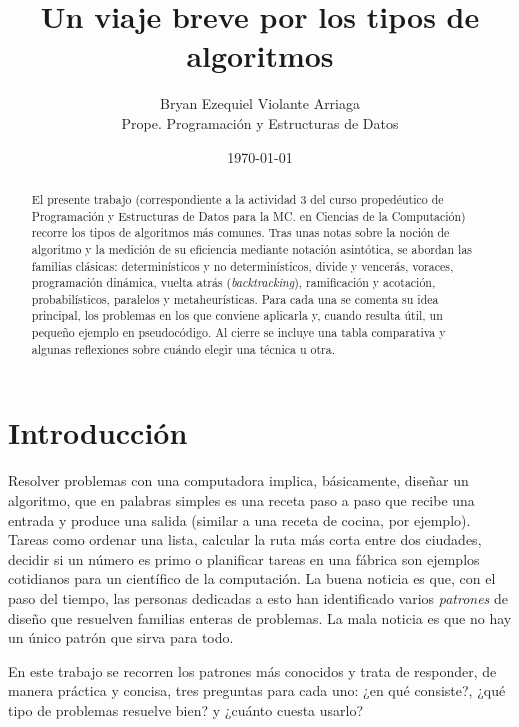 \documentclass[12pt,letterpaper]{article}
\title{\textbf{Un viaje breve por los tipos de algoritmos}}
\author{Bryan Ezequiel Violante Arriaga\\
\small Prope. Programación y Estructuras de Datos\\}
\date{\today}
\begin{document}

\maketitle
\thispagestyle{empty}

\begin{abstract}
    \noindent
    El presente trabajo (correspondiente a la actividad 3 del curso
    propedéutico de Programación y Estructuras de Datos para la MC. en Ciencias
    de la Computación) recorre los tipos de algoritmos más comunes. Tras unas 
    notas sobre la noción de algoritmo y la medición de su eficiencia mediante 
    notación asintótica, se abordan las familias clásicas: determinísticos y no
    determinísticos, divide y vencerás, voraces, programación dinámica,
    vuelta atrás (\emph{backtracking}), ramificación y acotación,
    probabilísticos, paralelos y metaheurísticas. Para cada una se
    comenta su idea principal, los problemas en los que conviene aplicarla
    y, cuando resulta útil, un pequeño ejemplo en pseudocódigo. Al cierre
    se incluye una tabla comparativa y algunas reflexiones sobre cuándo
    elegir una técnica u otra.
    \vspace{0.5em}
\end{abstract}


\section{Introducción}
\label{sec:introduccion}

Resolver problemas con una computadora implica, básicamente, diseñar un 
algoritmo, que en palabras simples es una receta paso a paso que recibe una 
entrada y produce una salida (similar a una receta de cocina, por ejemplo). 
Tareas como ordenar una lista, calcular la ruta más corta entre dos ciudades, 
decidir si un número es primo o planificar tareas en una fábrica son ejemplos 
cotidianos para un científico de la computación. La buena noticia es que, con 
el paso del tiempo, las personas dedicadas a esto han identificado varios 
\emph{patrones} de diseño que resuelven familias enteras de problemas. 
La mala noticia es que no hay un único patrón que sirva para todo.

En este trabajo se recorren los patrones más conocidos y trata de responder, de 
manera práctica y concisa, tres preguntas para cada uno: ¿en qué consiste?, 
¿qué tipo de problemas resuelve bien? y ¿cuánto cuesta usarlo?
\end{document}
